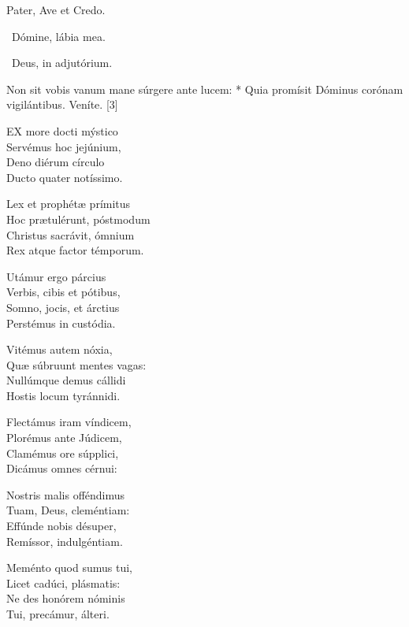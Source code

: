 


Pater, Ave et Credo.

\V\ Dómine, lábia mea.

\V\ Deus, in adjutórium.



 Non sit vobis vanum mane súrgere ante lucem: * Quia promísit Dóminus corónam vigilántibus.  Veníte. [3]


\lettrine[lines=2]{E}{X} more docti mýstico\\
Servémus hoc jejúnium,\\
Deno diérum círculo\\
Ducto quater notíssimo.

Lex et prophétæ prímitus\\
Hoc prætulérunt, póstmodum\\
Christus sacrávit, ómnium\\
Rex atque factor témporum.

Utámur ergo párcius\\
Verbis, cibis et pótibus,\\
Somno, jocis, et árctius\\
Perstémus in custódia.

Vitémus autem nóxia,\\
Quæ súbruunt mentes vagas:\\
Nullúmque demus cállidi\\
Hostis locum tyránnidi.

Flectámus iram víndicem,\\
Plorémus ante Júdicem,\\
Clamémus ore súpplici,\\
Dicámus omnes cérnui:

Nostris malis offéndimus\\
Tuam, Deus, cleméntiam:\\
Effúnde nobis désuper,\\
Remíssor, indulgéntiam.

Meménto quod sumus tui,\\
Licet cadúci, plásmatis:\\
Ne des honórem nóminis\\
Tui, precámur, álteri.

